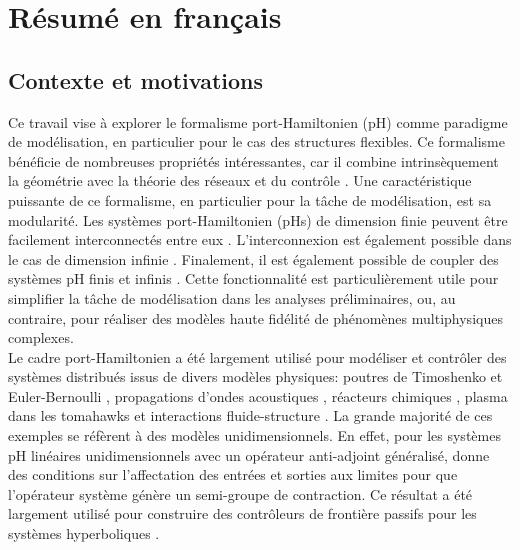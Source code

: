 \begingroup
\renewcommand\thechapter{R}
\titleformat{\chapter}[display]
{\normalfont\huge\bfseries}{}{20pt}{\Huge}
\chapter{R\'esum\'e en fran\c{c}ais}


\minitoc

\section{Contexte et motivations}


Ce travail vise à explorer le formalisme port-Hamiltonien (pH) comme paradigme de modélisation, en particulier pour le cas des structures flexibles. Ce formalisme bénéficie de nombreuses propriétés intéressantes, car il combine intrinsèquement la géométrie avec la théorie des réseaux et du contrôle \cite{vanderschaft2006book}. Une caractéristique puissante de ce formalisme, en particulier pour la tâche de modélisation, est sa modularité. Les systèmes port-Hamiltonien (pHs) de dimension finie peuvent être facilement interconnectés entre eux \cite{cervera2007interconnection}. L'interconnexion est également possible dans le cas de dimension infinie \cite{kurula2010,augner2020int}. Finalement, il est également possible de coupler des systèmes pH finis et infinis \cite{pasumarthy2006}. Cette fonctionnalité est particulièrement utile pour simplifier la tâche de modélisation dans les analyses préliminaires, ou, au contraire, pour réaliser des modèles haute fidélité de phénomènes multiphysiques complexes. \\

Le cadre port-Hamiltonien a été largement utilisé pour modéliser et contrôler des systèmes distribués issus de divers modèles physiques: poutres de Timoshenko \cite{macchelli2004timo} et Euler-Bernoulli \cite{aoues2017modeling}, propagations d'ondes acoustiques \cite{trenchant2018}, réacteurs chimiques \cite{ramirez2013irreversible}, plasma dans les tomahawks \cite{vu2016plasma} et interactions fluide-structure \cite{cardoso2017}. La grande majorité de ces exemples se réfèrent à des modèles unidimensionnels. En effet, pour les systèmes pH linéaires unidimensionnels avec un opérateur anti-adjoint généralisé, \cite{legorrec2005} donne des conditions sur l'affectation des entrées et sorties aux limites pour que l'opérateur système génère un semi-groupe de contraction. Ce résultat a été largement utilisé pour construire des contrôleurs de frontière passifs pour les systèmes hyperboliques \cite{villegas2009exponential,macchelli2016synthesis,macchelli2020exponential}. \\

